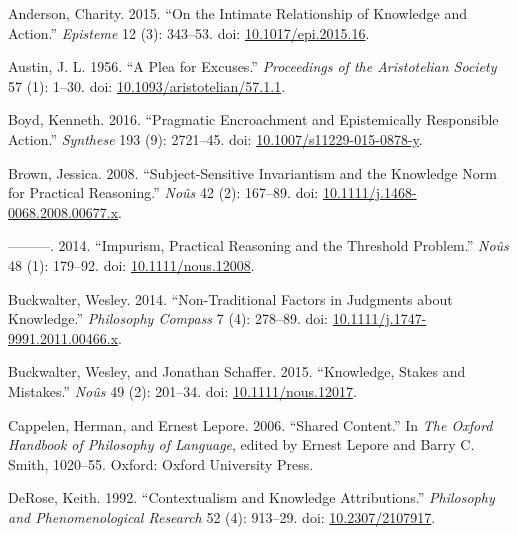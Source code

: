 \documentclass[
  11pt,
  letterpaper,
  DIV=11,
  numbers=noendperiod,
  twoside]{scrartcl}
\newlength{\cslhangindent}
\newenvironment{CSLReferences}[2] %
 {\begin{list}{}{%
  \setlength{\itemindent}{0pt}
  \setlength{\leftmargin}{0pt}
  \setlength{\parsep}{0pt}
  \ifodd #1
   \setlength{\leftmargin}{\cslhangindent}
   \setlength{\itemindent}{-1\cslhangindent}
  \fi
  \setlength{\itemsep}{#2\baselineskip}}}
 {\end{list}}
\begin{document}
\label{refs}
\begin{CSLReferences}{1}{0}
Anderson, Charity. 2015. {``On the Intimate Relationship of Knowledge
and Action.''} \emph{Episteme} 12 (3): 343--53. doi:
\href{https://doi.org/10.1017/epi.2015.16}{10.1017/epi.2015.16}.

Austin, J. L. 1956. {``A Plea for Excuses.''} \emph{Proceedings of the
Aristotelian Society} 57 (1): 1--30. doi:
\href{https://doi.org/10.1093/aristotelian/57.1.1}{10.1093/aristotelian/57.1.1}.

Boyd, Kenneth. 2016. {``Pragmatic Encroachment and Epistemically
Responsible Action.''} \emph{Synthese} 193 (9): 2721--45. doi:
\href{https://doi.org/10.1007/s11229-015-0878-y}{10.1007/s11229-015-0878-y}.

Brown, Jessica. 2008. {``Subject-Sensitive Invariantism and the
Knowledge Norm for Practical Reasoning.''} \emph{No{û}s} 42 (2):
167--89. doi:
\href{https://doi.org/10.1111/j.1468-0068.2008.00677.x}{10.1111/j.1468-0068.2008.00677.x}.

---------. 2014. {``Impurism, Practical Reasoning and the Threshold
Problem.''} \emph{No{û}s} 48 (1): 179--92. doi:
\href{https://doi.org/10.1111/nous.12008}{10.1111/nous.12008}.

Buckwalter, Wesley. 2014. {``Non-Traditional Factors in Judgments about
Knowledge.''} \emph{Philosophy Compass} 7 (4): 278--89. doi:
\href{https://doi.org/10.1111/j.1747-9991.2011.00466.x}{10.1111/j.1747-9991.2011.00466.x}.

Buckwalter, Wesley, and Jonathan Schaffer. 2015. {``Knowledge, Stakes
and Mistakes.''} \emph{No{û}s} 49 (2): 201--34. doi:
\href{https://doi.org/10.1111/nous.12017}{10.1111/nous.12017}.

Cappelen, Herman, and Ernest Lepore. 2006. {``Shared Content.''} In
\emph{The Oxford Handbook of Philosophy of Language}, edited by Ernest
Lepore and Barry C. Smith, 1020--55. Oxford: Oxford University Press.

DeRose, Keith. 1992. {``Contextualism and Knowledge Attributions.''}
\emph{Philosophy and Phenomenological Research} 52 (4): 913--29. doi:
\href{https://doi.org/10.2307/2107917}{10.2307/2107917}.


\end{CSLReferences}
\end{document}
